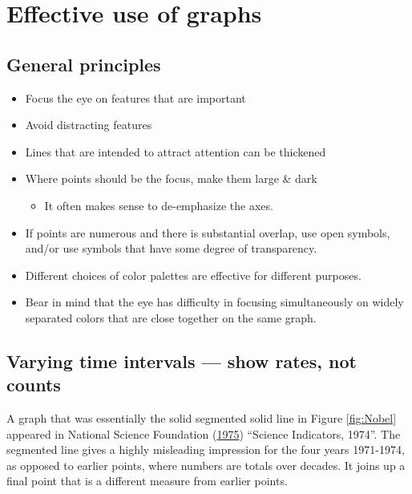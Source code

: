 \documentclass[
  10pt,
  b5paper]{book}
\providecommand{\tightlist}{%
  \setlength{\itemsep}{0pt}\setlength{\parskip}{0pt}}
\begin{document}
\hypertarget{effective-use-of-graphs}{%
\chapter{Effective use of graphs}\label{effective-use-of-graphs}}

\hypertarget{general-principles}{%
\section{General principles}\label{general-principles}}

\begin{itemize}
\tightlist
\item
  Focus the eye on features that are important
\item
  Avoid distracting features
\item
  Lines that are intended to attract attention can be
  thickened
\item
  Where points should be the focus, make them large \& dark

  \begin{itemize}
  \tightlist
  \item
    It often makes sense to de-emphasize the axes.
  \end{itemize}
\item
  If points are numerous and there is substantial overlap,
  use open symbols, and/or use symbols that have some
  degree of transparency.
\item
  Different choices of color palettes are effective for different purposes.
\item
  Bear in mind that the eye has difficulty in focusing
  simultaneously on widely separated colors that are close
  together on the same graph.
\end{itemize}

\hypertarget{varying-time-intervals-show-rates-not-counts}{%
\section{Varying time intervals --- show rates, not counts}\label{varying-time-intervals-show-rates-not-counts}}

A graph that was essentially the solid segmented solid line in
Figure \ref{fig:Nobel} appeared in National Science Foundation (\protect\hyperlink{ref-national1975science}{1975})
``Science Indicators, 1974''. The segmented line gives
a highly misleading impression for the four years 1971-1974, as
opposed to earlier points, where numbers are totals over decades.
It joins up a final point that is a different measure from earlier
points.
\end{document}
